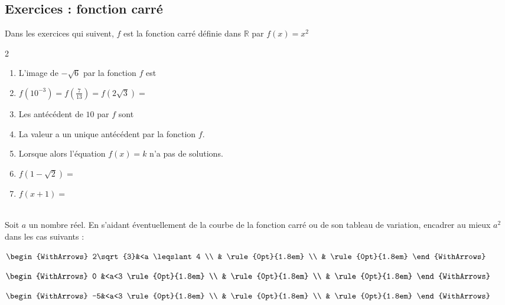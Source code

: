 \documentclass[main.tex]{subfiles}
\begin{document}
\subsection{Exercices : fonction carré}
\begin{eBox}
Dans les exercices qui suivent, $f$ est la fonction carré définie dans $\mathbb{R}$ par $f (x) = x^2$ 
\end{eBox}
\vspace{-0.5em}
\begin{exercise}\hfill   
\vspace{-0.5em}
\begin{spacing}{2} 
\begin{enumerate}[label={}, leftmargin=*]   
	\item  L'image de $-\sqrt{6}$ par la fonction $f$ est  \dotfill   
	\item $f(10^{-3})=$\dotfill $f\left(\frac{7}{13}\right)=$\dotfill $f(2\sqrt{3})=$\dotfill 
	\item Les antécédent de $10$ par $f$ sont \dotfill 
	\item La valeur \dotfill a un unique antécédent par la fonction $f$.
	\item Lorsque \dotfill alors l'équation $f(x)=k$ n'a pas de solutions. 
	\item $f(1-\sqrt{2})=$\dotfill 
	\item $f(x+1)=$\dotfill
\end{enumerate}
\end{spacing}
\vspace{-0.5em} 
\end{exercise}
\begin{example}\hfill \\
	Soit $a$ un nombre réel.  En s'aidant éventuellement de la courbe de la fonction carré ou de son tableau de variation, encadrer au mieux $a^2$ dans les cas suivants :
	
	\noindent\hfill\parbox{0.24\linewidth}{	
		$\begin{WithArrows}
			2\sqrt{3}&<a \leqslant 4 \\
			&  \rule{0pt}{1.8em} \\
			&  \rule{0pt}{1.8em}    
		\end{WithArrows}$ 	
	} \hfill\parbox{0.24\linewidth}{	
		$\begin{WithArrows}
			0 &<a<3 \rule{0pt}{1.8em} \\ %
			&  \rule{0pt}{1.8em}  \\  
			&   \rule{0pt}{1.8em}    
		\end{WithArrows}$ 	
	} \hfill\parbox{0.31\linewidth}{	
		$\begin{WithArrows}
			-5&<a<3 \rule{0pt}{1.8em} \\ %
			&  \rule{0pt}{1.8em}  \\  
			&   \rule{0pt}{1.8em}   
		\end{WithArrows}$ 	
	} 
\end{example} 
\end{document}
